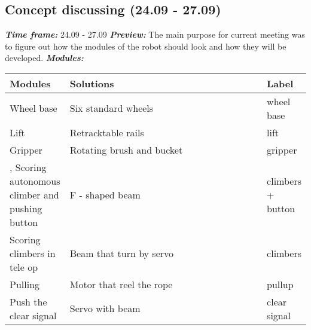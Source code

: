 \addtocounter{number_of_meeting}{1}
\subsection{Concept discussing (24.09 - 27.09)}
\textit{\textbf{Time frame:}} 24.09 - 27.09 \newline
\textit{\textbf{Preview:}} The main purpose for current meeting was to figure out how the modules of the robot should look and how they will be developed. \newline \newline
\textit{\textbf{Modules:}}

\begin{table}[H]
	\vspace{-2mm}
	\begin{center}
		\begin{tabular}{|p{0.2\linewidth}|p{0.7\linewidth}|p{0.1\linewidth}|}
			\hline
			Modules & Solutions & Label \\
			\hline
			Wheel base & Six standard wheels & wheel base \\
			\hline
			Lift & Retracktable rails & lift \\
			\hline
			Gripper & Rotating brush and bucket & gripper\\
			\hline,
			Scoring autonomous climber and pushing button & F - shaped beam & climbers + button\\
			\hline
			Scoring climbers in tele op & Beam that turn by servo & climbers\\
			\hline
			Pulling & Motor that reel the rope & pullup\\
			\hline
			Push the clear signal & Servo with beam & clear signal\\
			\hline
		\end{tabular}
	\end{center}
\end{table}

